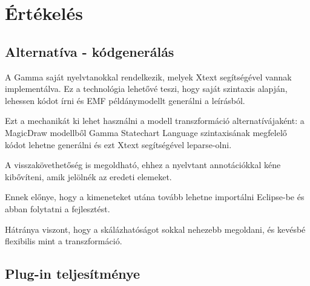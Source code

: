 \chapter{Értékelés}
\label{chap:ertekeles}
\section{Alternatíva - kódgenerálás}
A Gamma saját nyelvtanokkal rendelkezik, melyek Xtext segítségével vannak implementálva. Ez a technológia lehetővé teszi, hogy saját szintaxis alapján, lehessen kódot írni és EMF példánymodellt generálni a leírásból.

Ezt a mechanikát ki lehet használni a modell transzformáció alternatívájaként: a MagicDraw modellből Gamma Statechart Language szintaxisának megfelelő kódot lehetne generálni és ezt Xtext segítségével leparse-olni.

A visszakövethetőség is megoldható, ehhez a nyelvtant annotációkkal kéne kibővíteni, amik jelölnék az eredeti elemeket.

Ennek előnye, hogy a kimeneteket utána tovább lehetne importálni Eclipse-be és abban folytatni a fejlesztést.

Hátránya viszont, hogy a skálázhatóságot sokkal nehezebb megoldani, és kevésbé flexibilis mint a transzformáció.

\section{Plug-in teljesítménye}

